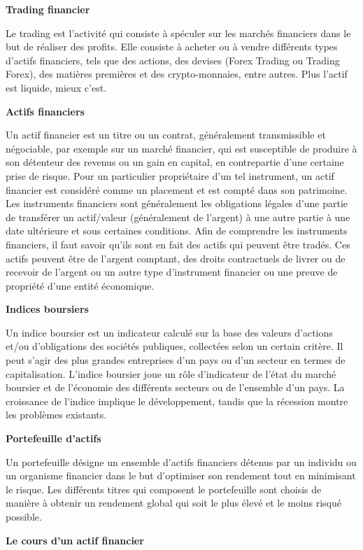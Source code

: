 \textbf{Trading financier}

Le trading est l'activité qui consiste à spéculer sur les marchés
financiers dans le but de réaliser des profits. Elle consiste à acheter
ou à vendre différents types d'actifs financiers, tels que des actions,
des devises (Forex Trading ou Trading Forex), des matières premières et
des crypto-monnaies, entre autres. Plus l'actif est liquide, mieux
c'est.

\textbf{Actifs financiers}

Un actif financier est un titre ou un contrat, généralement
transmissible et négociable, par exemple sur un marché financier, qui
est susceptible de produire à son détenteur des revenus ou un gain en
capital, en contrepartie d'une certaine prise de risque. Pour un
particulier propriétaire d'un tel instrument, un actif financier est
considéré comme un placement et est compté dans son patrimoine. Les
instruments financiers sont généralement les obligations légales d'une
partie de transférer un actif/valeur (généralement de l'argent) à une
autre partie à une date ultérieure et sous certaines conditions. Afin de
comprendre les instruments financiers, il faut savoir qu'ils sont en
fait des actifs qui peuvent être tradés. Ces actifs peuvent être de
l'argent comptant, des droits contractuels de livrer ou de recevoir de
l'argent ou un autre type d'instrument financier ou une preuve de
propriété d'une entité économique.

\textbf{Indices boursiers}

Un indice boursier est un indicateur calculé sur la base des valeurs
d'actions et/ou d'obligations des sociétés publiques, collectées selon
un certain critère. Il peut s'agir des plus grandes entreprises d'un
pays ou d'un secteur en termes de capitalisation. L'indice boursier joue
un rôle d'indicateur de l'état du marché boursier et de l'économie des
différents secteurs ou de l'ensemble d'un pays. La croissance de
l'indice implique le développement, tandis que la récession montre les
problèmes existants.

\textbf{Portefeuille d'actifs}

Un portefeuille désigne un ensemble d'actifs financiers détenus par un
individu ou un organisme financier dans le but d'optimiser son rendement
tout en minimisant le risque. Les différents titres qui composent le
portefeuille sont choisis de manière à obtenir un rendement global qui
soit le plus élevé et le moins risqué possible.

\textbf{Le cours d'un actif financier}

